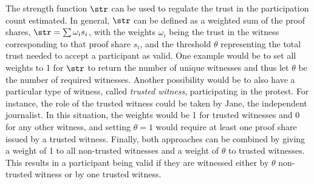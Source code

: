 The strength function \(\str\) can be used to regulate the trust in the 
participation count estimated. In general, \(\str\) can be defined as a 
weighted sum of the proof shares, \(\str = \sum \omega_i s_i\), with the 
weights \(\omega_i\) being the trust in the witness corresponding to that proof 
share \(s_i\), and the threshold \(\theta\) representing the total trust needed 
to accept a participant as valid.
One example would be to set all weights to 1 for \(\str\) to return the number of unique witnesses and thus let \(\theta\) be the number of required witnesses.
Another possibility would be to also have a particular type of witness, called \emph{trusted witness}, participating in the protest. 
For instance, the role of the trusted witness could be taken by Jane, the independent journalist. 
In this situation, the weights would be 1 for trusted witnesses and 0 for any other witness, and
setting \(\theta = 1\) would require at least one proof share issued by a trusted witness.
Finally, both approaches can be combined by giving a weight of 1 to all 
non-trusted witnesses and a weight of \(\theta\) to trusted witnesses. This 
results in a participant being valid if they are witnessed either by \(\theta\) 
non-trusted witness or by one trusted witness.

